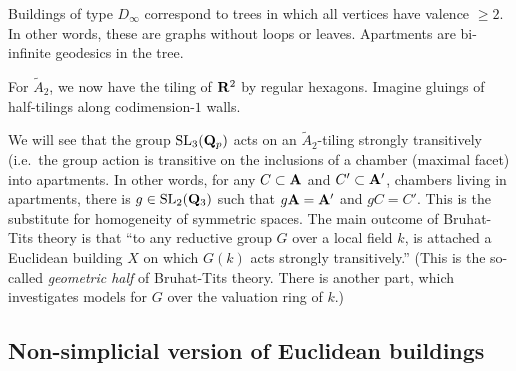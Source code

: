 \documentclass{article}
\begin{document}
\begin{example}
Buildings of type $D_\infty$ correspond to trees in which all vertices have
valence $\geqslant 2$. In other words, these are graphs without loops or 
leaves. Apartments are bi-infinite geodesics in the tree. 
\end{example}

\begin{example}
For $\widetilde A_2$, we now have the tiling of $\mathbf{R}^2$ by regular hexagons. 
Imagine gluings of half-tilings along codimension-$1$ walls. 
\end{example}

We will see that the group $\operatorname{SL}_3(\mathbf{Q}_p)$ acts on an 
$\widetilde A_2$-tiling strongly transitively (i.e.\ the group action is 
transitive on the inclusions of a chamber (maximal facet) into 
apartments. In other words, for any $C\subset\mathbf{A}$ and $C'\subset \mathbf{A}'$, 
chambers living in apartments, there is $g\in \operatorname{SL}_2(\mathbf{Q}_3)$ such 
that $g \mathbf{A}=\mathbf{A}'$ and $g C=C'$. This is the substitute for homogeneity of 
symmetric spaces. The main outcome of Bruhat-Tits theory is that ``to any 
reductive group $G$ over a local field $k$, is attached a Euclidean building 
$X$ on which $G(k)$ acts strongly transitively.'' (This is the so-called 
\emph{geometric half} of Bruhat-Tits theory. There is another part, which 
investigates models for $G$ over the valuation ring of $k$.) 


\subsection{Non-simplicial version of Euclidean buildings}
\end{document}
